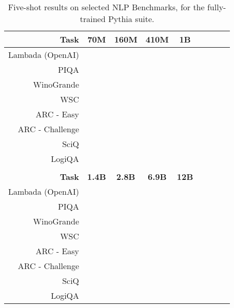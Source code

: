 \documentclass{article}
\theoremstyle{plain}
\theoremstyle{definition}
\theoremstyle{remark}
\begin{document}
\begin{table}[H]
\centering
\begin{tabular}{rcccccccc}
\toprule
\textbf{Task} & \textbf{70M} & \textbf{160M} & \textbf{410M} & \textbf{1B} \\
\midrule
Lambada (OpenAI) &  &  &  &  \\
PIQA &  &  &  &  \\
WinoGrande &  &  &  &  \\
WSC &  &  &  &  \\
ARC - Easy &  &  &  &  \\
ARC - Challenge &  &  &  &  \\
SciQ &  &  &  &  \\
LogiQA &  &  &  &  \\
\bottomrule
\\
\textbf{Task} & \textbf{1.4B} & \textbf{2.8B} & \textbf{6.9B} & \textbf{12B} \\
\midrule
Lambada (OpenAI) &  &  &  &  \\
PIQA &  &  &  &  \\
WinoGrande &  &  &  &  \\
WSC &  &  &  &  \\
ARC - Easy & &  &  &  \\
ARC - Challenge & &  &  &  \\
SciQ &  &  &  &  \\
LogiQA &  &  &  &  \\
\bottomrule
\end{tabular}
\caption{Five-shot results on selected NLP Benchmarks, for the fully-trained Pythia suite.}
\end{table}
\end{document}
